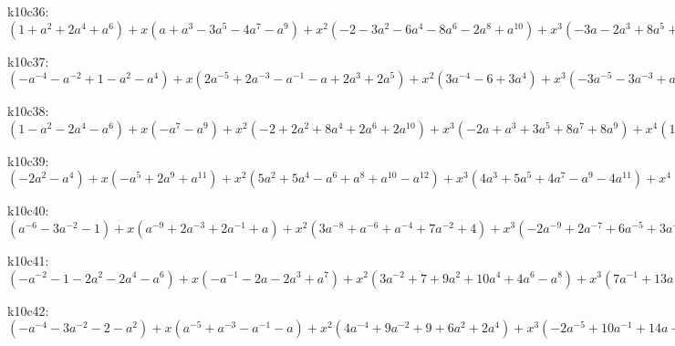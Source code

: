 k10c36: $ (1+a^{2}+2a^{4}+a^{6}) +x(a+a^{3}-3a^{5}-4a^{7}-a^{9}) +x^{2}(-2-3a^{2}-6a^{4}-8a^{6}-2a^{8}+a^{10}) +x^{3}(-3a-2a^{3}+8a^{5}+16a^{7}+9a^{9}) +x^{4}(1+6a^{4}+18a^{6}+8a^{8}-3a^{10}) +x^{5}(2a-6a^{5}-15a^{7}-11a^{9}) +x^{6}(2a^{2}-3a^{4}-16a^{6}-10a^{8}+a^{10}) +x^{7}(2a^{3}+a^{5}+2a^{7}+3a^{9}) +x^{8}(2a^{4}+5a^{6}+3a^{8}) +x^{9}(a^{5}+a^{7}) $

k10c37: $ (-a^{-4}-a^{-2}+1-a^{2}-a^{4}) +x(2a^{-5}+2a^{-3}-a^{-1}-a+2a^{3}+2a^{5}) +x^{2}(3a^{-4}-6+3a^{4}) +x^{3}(-3a^{-5}-3a^{-3}+a^{-1}+a-3a^{3}-3a^{5}) +x^{4}(-5a^{-4}+2a^{-2}+14+2a^{2}-5a^{4}) +x^{5}(a^{-5}-2a^{-3}-2a^{3}+a^{5}) +x^{6}(2a^{-4}-3a^{-2}-10-3a^{2}+2a^{4}) +x^{7}(2a^{-3}+2a^{3}) +x^{8}(2a^{-2}+4+2a^{2}) +x^{9}(a^{-1}+a) $

k10c38: $ (1-a^{2}-2a^{4}-a^{6}) +x(-a^{7}-a^{9}) +x^{2}(-2+2a^{2}+8a^{4}+2a^{6}+2a^{10}) +x^{3}(-2a+a^{3}+3a^{5}+8a^{7}+8a^{9}) +x^{4}(1-3a^{2}-8a^{4}+3a^{6}+4a^{8}-3a^{10}) +x^{5}(2a-2a^{3}-7a^{5}-13a^{7}-10a^{9}) +x^{6}(3a^{2}+2a^{4}-10a^{6}-8a^{8}+a^{10}) +x^{7}(3a^{3}+3a^{5}+3a^{7}+3a^{9}) +x^{8}(2a^{4}+5a^{6}+3a^{8}) +x^{9}(a^{5}+a^{7}) $

k10c39: $ (-2a^{2}-a^{4}) +x(-a^{5}+2a^{9}+a^{11}) +x^{2}(5a^{2}+5a^{4}-a^{6}+a^{8}+a^{10}-a^{12}) +x^{3}(4a^{3}+5a^{5}+4a^{7}-a^{9}-4a^{11}) +x^{4}(-4a^{2}-4a^{4}+5a^{6}-4a^{10}+a^{12}) +x^{5}(-6a^{3}-9a^{5}-9a^{7}-3a^{9}+3a^{11}) +x^{6}(a^{2}-3a^{4}-10a^{6}-2a^{8}+4a^{10}) +x^{7}(2a^{3}+2a^{5}+4a^{7}+4a^{9}) +x^{8}(2a^{4}+5a^{6}+3a^{8}) +x^{9}(a^{5}+a^{7}) $

k10c40: $ (a^{-6}-3a^{-2}-1) +x(a^{-9}+2a^{-3}+2a^{-1}+a) +x^{2}(3a^{-8}+a^{-6}+a^{-4}+7a^{-2}+4) +x^{3}(-2a^{-9}+2a^{-7}+6a^{-5}+3a^{-3}-a^{-1}-2a) +x^{4}(-6a^{-8}-5a^{-6}-2a^{-4}-9a^{-2}-6) +x^{5}(a^{-9}-6a^{-7}-13a^{-5}-12a^{-3}-5a^{-1}+a) +x^{6}(3a^{-8}-5a^{-4}+a^{-2}+3) +x^{7}(4a^{-7}+7a^{-5}+7a^{-3}+4a^{-1}) +x^{8}(3a^{-6}+6a^{-4}+3a^{-2}) +x^{9}(a^{-5}+a^{-3}) $

k10c41: $ (-a^{-2}-1-2a^{2}-2a^{4}-a^{6}) +x(-a^{-1}-2a-2a^{3}+a^{7}) +x^{2}(3a^{-2}+7+9a^{2}+10a^{4}+4a^{6}-a^{8}) +x^{3}(7a^{-1}+13a+10a^{3}+a^{5}-3a^{7}) +x^{4}(-3a^{-2}-4-8a^{2}-14a^{4}-6a^{6}+a^{8}) +x^{5}(-9a^{-1}-20a-18a^{3}-4a^{5}+3a^{7}) +x^{6}(a^{-2}-5-7a^{2}+4a^{4}+5a^{6}) +x^{7}(3a^{-1}+6a+8a^{3}+5a^{5}) +x^{8}(3+6a^{2}+3a^{4}) +x^{9}(a+a^{3}) $

k10c42: $ (-a^{-4}-3a^{-2}-2-a^{2}) +x(a^{-5}+a^{-3}-a^{-1}-a) +x^{2}(4a^{-4}+9a^{-2}+9+6a^{2}+2a^{4}) +x^{3}(-2a^{-5}+10a^{-1}+14a+5a^{3}-a^{5}) +x^{4}(-6a^{-4}-11a^{-2}-8-10a^{2}-7a^{4}) +x^{5}(a^{-5}-5a^{-3}-18a^{-1}-24a-11a^{3}+a^{5}) +x^{6}(3a^{-4}+2a^{-2}-5+4a^{4}) +x^{7}(4a^{-3}+9a^{-1}+11a+6a^{3}) +x^{8}(3a^{-2}+7+4a^{2}) +x^{9}(a^{-1}+a) $

